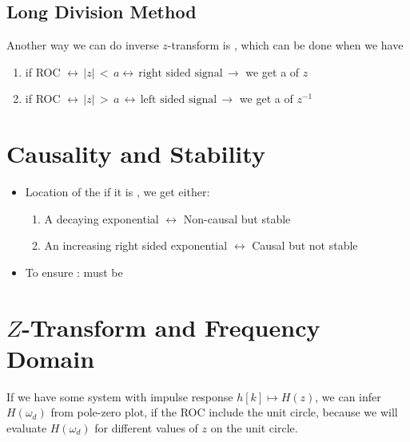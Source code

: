 \documentclass[12pt,a4paper]{book}
\begin{document}
\subsection{Long Division Method}

Another way we can do  inverse $z$-transform is , which can be done when we have 

	\begin{enumerate}
	\item if ROC  $\leftrightarrow \, |z| \, < \, a \leftrightarrow \, \text{right sided signal} \, \rightarrow$ we get a  of $z$ 
	
		\item if ROC  $\leftrightarrow \, |z| \, > \, a \, \leftrightarrow \, \text{left sided signal} \, \rightarrow$ we get a  of $z^{-1}$ 
	\end{enumerate}


\section{Causality and Stability}

\begin{itemize}

\item Location of the  if it is , we get either:

	\begin{enumerate}
	\item A decaying exponential $\leftrightarrow$ Non-causal but stable
	
	\item An increasing right sided exponential $\leftrightarrow$ Causal but not stable	
	\end{enumerate}

\item To ensure :   must be 

\end{itemize}

\section{$Z$-Transform and Frequency Domain}

If we have some system with impulse response $h[k] \mapsto H(z)$, we can infer $H(\omega_d)$ from pole-zero plot, if the ROC include the unit circle, because we will evaluate $H(\omega_d)$ for different values of $z$ on the unit circle.\\
\end{document}
